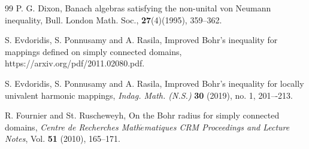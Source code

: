 \documentclass[a4paper,12pt]{amsart}
\theoremstyle{plain}
\theoremstyle{definition}
\begin{document}
\begin{thebibliography}{99}
	 {\sc P. G. Dixon}, Banach algebras satisfying the non-unital von Neumann inequality, Bull. London Math. Soc., \textbf{27}(4)(1995), 359--362.
	
	
	 {\sc S. Evdoridis}, {\sc S. Ponnusamy} and {A. Rasila}, Improved Bohr's inequality for mappings defined on simply connected domains, https://arxiv.org/pdf/2011.02080.pdf.
	
	
	 {\sc S. Evdoridis}, {\sc S. Ponnusamy} and {\sc A. Rasila}, Improved Bohr's inequality for locally univalent harmonic mappings, {\it Indag. Math. (N.S.)} {\bf 30} (2019), no. 1, 201–-213.
	
	
	
	 {\sc R. Fournier} and {\sc St. Ruscheweyh}, On the Bohr radius for simply connected domains, \textit{Centre de Recherches Math$ \acute{e} $matiques CRM Proceedings and Lecture Notes}, Vol. \textbf{51} (2010), 165--171.
	
	
	
	

\end{thebibliography}
\end{document}
